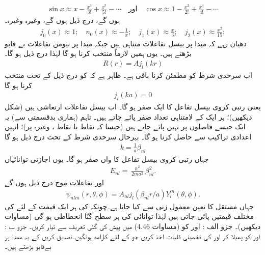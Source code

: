\begin{align*}
\sin x\approx x-\frac{x^{3}}{3!}+\frac{x^{5}}{5!}-\dotsb\quad \text{اور}\quad  \cos x \approx 1-\frac{x^{2}}{2!}+\frac{x^{4}}{4!}-\dotsb
\end{align*}
 ہوں گے، درج ذیل ہوں گے، وغیرہ وغیرہ۔
\begin{align*}
j_{0}(x)\approx1;\quad{n_{0}(x)\approx-\frac{1}{x}};\quad{j_{1}(x)\approx\frac{x}{3}};\quad{j_{2}(x)\approx\frac{x^{2}}{15}}; 
\end{align*}
 دھیان رہے کہ مبدا  پر بیسل تفاعلات متناہی  ہیں جبکہ مبدا پر نیومن تفاعلات بے قابو بڑھتے ہیں۔ یوں ہمیں لازماً   منتخب کرنا ہو گا لہٰذا درج ذیل ہو گا۔
\begin{align}
R(r)=Aj_{l}(kr) 
\end{align}
اب سرحدی شرط  کو مطمئن کرنا باقی ہے۔ ظاہر ہے کہ  کو درج ذیل کے تحت منتخب کرنا ہو گا
\begin{align}
j_{l}(ka)=0
\end{align}
یعنی  رتبی کروی بیسل تفاعل کا  ایک صفر ہو گا۔ اب بیسل تفاعلات ارتعاشی ہیں (شکل  دیکھیں)؛ ہر ایک کے لامتناہی تعداد  صفر پائے جاتے ہیں۔ تاہم (ہماری بدقسمتی سے) یہ ایک جیسے فاصلوں پر نہیں پائے جاتے ہیں (جیسا کہ نقاط  یا نقاط
، وغیرہ پر)؛ انہیں اعدادی تراکیب سے حاصل کرنا ہو گا۔ بہرحال سرحدی شرط کے تحت درج ذیل ہو گا
\begin{align}
k=\frac{1}{a}\beta_{nl} 
\end{align}
جہاں  رتبی  کروی بیسل تفاعل کا  واں صفر   ہو گا۔ یوں اجازتی توانائیاں 
\begin{align}
E_{nl}=\frac{\hslash^{2}}{2ma^{2}}\beta_{nl}^{2}. 
\end{align}
اور تفاعلات موج درج ذیل ہوں گے 
\begin{align}
\psi_{nlm}(r,\theta,\phi)=A_{nl}j_{l}(\beta_{nl}r/a)Y_{l}^{m}(\theta,\phi). 
\end{align}
جہاں مستقل  کا تعین معمول زنی سے کیا جاتا ہے۔چونکہ  کی ہر ایک قیمت کے لئے  کی 
مختلف قیمتیں پائی جاتی ہیں لہٰذا توانائی کی ہر سطح  گنّا انحطاطی ہو گی (مساوات  دیکھیں)۔
جزو الف :
اور
کو (مساوات 4.46) میں پیش کی گئی تعریف سے تیار کریں۔
جزو ب :
اور
کو پھیلا کر
اور
کی تخمینی قلیات اخذ کریں جو
کے لئے كارامد ہونگیں۔تصدیق کریں کے یہ ممدا پر بےقابو بڑھتے ہیں۔
